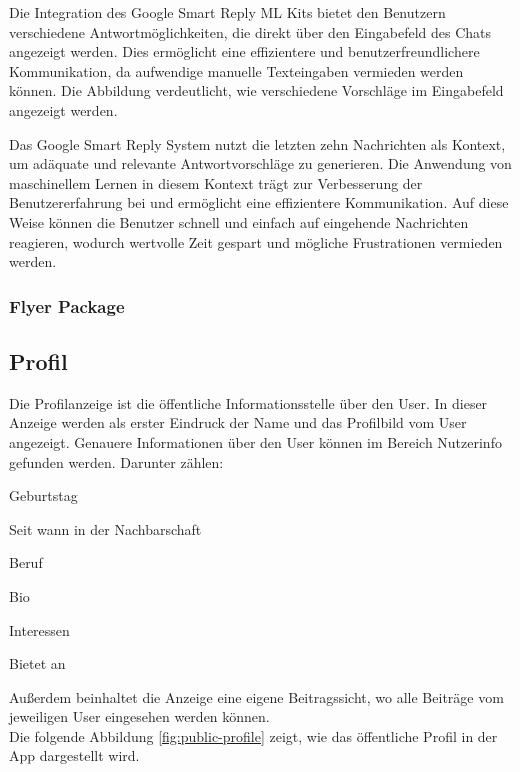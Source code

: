 Die Integration des Google Smart Reply ML Kits bietet den Benutzern verschiedene Antwortmöglichkeiten, die direkt über den Eingabefeld des Chats angezeigt werden. Dies ermöglicht eine effizientere und benutzerfreundlichere Kommunikation, da aufwendige manuelle Texteingaben vermieden werden können. Die Abbildung verdeutlicht, wie verschiedene Vorschläge im Eingabefeld angezeigt werden.

Das Google Smart Reply System nutzt die letzten zehn Nachrichten als Kontext, um adäquate und relevante Antwortvorschläge zu generieren. Die Anwendung von maschinellem Lernen in diesem Kontext trägt zur Verbesserung der Benutzererfahrung bei und ermöglicht eine effizientere Kommunikation. Auf diese Weise können die Benutzer schnell und einfach auf eingehende Nachrichten reagieren, wodurch wertvolle Zeit gespart und mögliche Frustrationen vermieden werden.

\subsubsection{Flyer Package}

\subsection{Profil}
Die Profilanzeige ist die öffentliche Informationsstelle über den User. In dieser Anzeige werden als erster Eindruck der Name und das Profilbild vom User angezeigt. Genauere Informationen über den User können im Bereich Nutzerinfo gefunden werden. Darunter zählen:
\begin{compactitem}
  \item Geburtstag
  \item Seit wann in der Nachbarschaft
  \item Beruf
  \item Bio
  \item Interessen
  \item Bietet an
\end{compactitem}
Außerdem beinhaltet die Anzeige eine eigene Beitragssicht, wo alle Beiträge vom jeweiligen User eingesehen werden können.
\\
Die folgende Abbildung \ref{fig:public-profile} zeigt, wie das öffentliche Profil in der App dargestellt wird.

